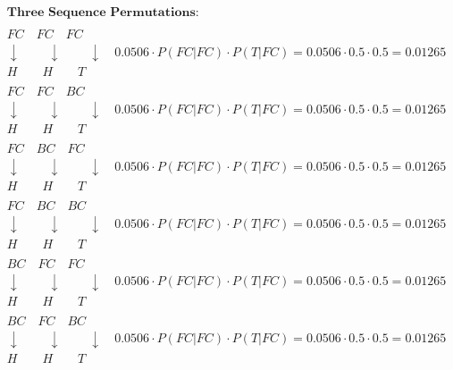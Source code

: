 \documentclass[a4paper]{article}
\begin{document}
\begin{sloppypar}
\begin{enumerate}[start=6,label=Q\arabic*,left=0pt]
    \begin{align*}
        & \textbf{Three Sequence Permutations}: \\\\
        & FC \quad FC \quad FC \\
        & \downarrow \quad \quad \: \downarrow \quad \quad \: \downarrow \quad 0.0506 \cdot P(FC | FC) \cdot P(T | FC) = 0.0506 \cdot 0.5 \cdot 0.5 = 0.01265 \\
        & H \quad \quad H \quad \quad T \\\\
        & FC \quad FC \quad BC \\
        & \downarrow \quad \quad \: \downarrow \quad \quad \: \downarrow \quad 0.0506 \cdot P(FC | FC) \cdot P(T | FC) = 0.0506 \cdot 0.5 \cdot 0.5 = 0.01265 \\
        & H \quad \quad H \quad \quad T \\\\
        & FC \quad BC \quad FC \\
        & \downarrow \quad \quad \: \downarrow \quad \quad \: \downarrow \quad 0.0506 \cdot P(FC | FC) \cdot P(T | FC) = 0.0506 \cdot 0.5 \cdot 0.5 = 0.01265 \\
        & H \quad \quad H \quad \quad T \\\\
        & FC \quad BC \quad BC \\
        & \downarrow \quad \quad \: \downarrow \quad \quad \: \downarrow \quad 0.0506 \cdot P(FC | FC) \cdot P(T | FC) = 0.0506 \cdot 0.5 \cdot 0.5 = 0.01265 \\
        & H \quad \quad H \quad \quad T \\\\
        & BC \quad FC \quad FC \\
        & \downarrow \quad \quad \: \downarrow \quad \quad \: \downarrow \quad 0.0506 \cdot P(FC | FC) \cdot P(T | FC) = 0.0506 \cdot 0.5 \cdot 0.5 = 0.01265 \\
        & H \quad \quad H \quad \quad T \\\\
        & BC \quad FC \quad BC \\
        & \downarrow \quad \quad \: \downarrow \quad \quad \: \downarrow \quad 0.0506 \cdot P(FC | FC) \cdot P(T | FC) = 0.0506 \cdot 0.5 \cdot 0.5 = 0.01265 \\
        & H \quad \quad H \quad \quad T \\\\

\end{align*}
\end{enumerate}
\end{sloppypar}
\end{document}
